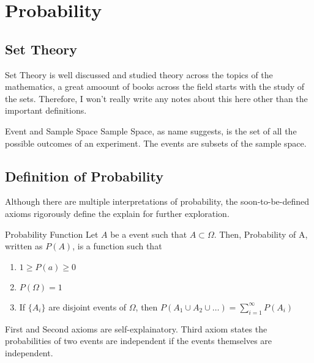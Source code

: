 \chapter{Probability}

\section{Set Theory}
Set Theory is well discussed and studied theory across the topics of the mathematics, a great amoount of books across the field starts with
the study of the sets. Therefore, I won't really write any notes about this here other than the important definitions.
\begin{definition}{Event and Sample Space}
    \alert{Sample Space}, as name suggests, is the set of all the possible outcomes of an experiment. The events are subsets of the sample space.
\end{definition}

\section{Definition of Probability}
Although there are multiple interpretations of probability, the soon-to-be-defined axioms rigorously define the explain for further exploration.
\begin{definition}{Probability Function}
    Let $A$ be a event such that $A \subset \Omega$. Then, \alert{Probability of A}, written as $P(A)$, is a function such that
    \begin{enumerate}
        \item $1 \ge P(a) \ge 0$ \\
        \item $P(\Omega) = 1$\\
        \item If $\{ A_i\}$ are disjoint events of $\Omega$, then $P(A_1 \cup A_2 \cup \ldots ) = \sum_{i=1}^{\infty} P(A_i)$
    \end{enumerate}
\end{definition}

First and Second axioms are self-explainatory. Third axiom states the probabilities of two events are independent if the events themselves
are independent.

